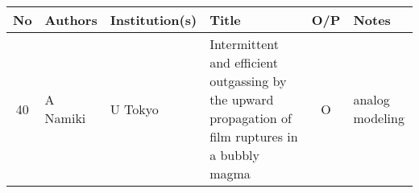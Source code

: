 \documentclass[authoryear,preprint,review,12pt,dvips]{article}
\begin{document}
\thispagestyle{empty}

\begin{table}[ht]
\fontsize{3mm}{4mm}
\end{table}

\begin{longtable}{c p{} p{}
    p{} %
  c p{}}
\toprule

No & Authors & Institution(s) & Title & O/P & Notes \\

\midrule
40 & A Namiki & U Tokyo & Intermittent and efficient outgassing by
the upward propagation of film ruptures in
a bubbly magma & O & analog modeling \\
\bottomrule

\end{longtable}
\end{document}
